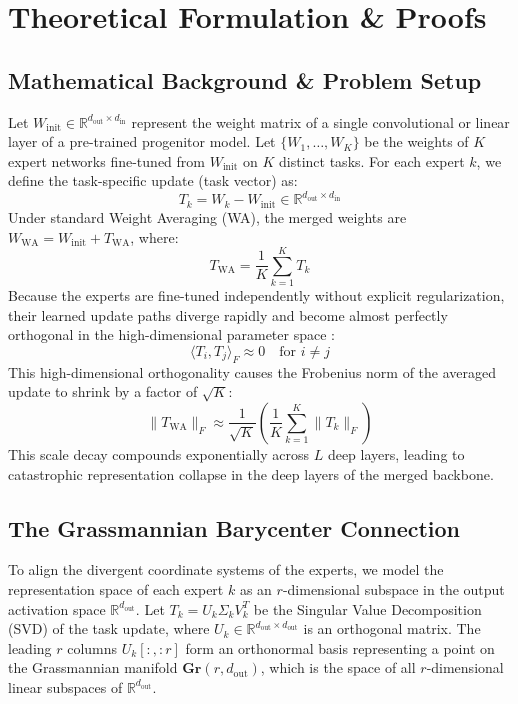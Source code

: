 \documentclass{article}
\theoremstyle{plain}
\theoremstyle{definition}
\theoremstyle{remark}
\begin{document}
\section{Theoretical Formulation \& Proofs}
\label{sec:theory}

\subsection{Mathematical Background \& Problem Setup}
Let $W_{\text{init}} \in \mathbb{R}^{d_{\text{out}} \times d_{\text{in}}}$ represent the weight matrix of a single convolutional or linear layer of a pre-trained progenitor model. Let $\{W_1, \ldots, W_K\}$ be the weights of $K$ expert networks fine-tuned from $W_{\text{init}}$ on $K$ distinct tasks. For each expert $k$, we define the task-specific update (task vector) as:
\begin{equation}
    T_k = W_k - W_{\text{init}} \in \mathbb{R}^{d_{\text{out}} \times d_{\text{in}}}
\end{equation}
Under standard Weight Averaging (WA), the merged weights are $W_{\text{WA}} = W_{\text{init}} + T_{\text{WA}}$, where:
\begin{equation}
    T_{\text{WA}} = \frac{1}{K} \sum_{k=1}^K T_k
\end{equation}
Because the experts are fine-tuned independently without explicit regularization, their learned update paths diverge rapidly and become almost perfectly orthogonal in the high-dimensional parameter space \citep{choshen2022fusing, anonymous2026holographic}:
\begin{equation}
    \langle T_i, T_j \rangle_F \approx 0 \quad \text{for } i \neq j
\end{equation}
This high-dimensional orthogonality causes the Frobenius norm of the averaged update to shrink by a factor of $\sqrt{K}$:
\begin{equation}
    \| T_{\text{WA}} \|_F \approx \frac{1}{\sqrt{K}} \left( \frac{1}{K} \sum_{k=1}^K \| T_k \|_F \right)
\end{equation}
This scale decay compounds exponentially across $L$ deep layers, leading to catastrophic representation collapse in the deep layers of the merged backbone.

\subsection{The Grassmannian Barycenter Connection}
To align the divergent coordinate systems of the experts, we model the representation space of each expert $k$ as an $r$-dimensional subspace in the output activation space $\mathbb{R}^{d_{\text{out}}}$. Let $T_k = U_k \Sigma_k V_k^T$ be the Singular Value Decomposition (SVD) of the task update, where $U_k \in \mathbb{R}^{d_{\text{out}} \times d_{\text{out}}}$ is an orthogonal matrix. The leading $r$ columns $U_k[:, :r]$ form an orthonormal basis representing a point on the Grassmannian manifold $\mathbf{Gr}(r, d_{\text{out}})$, which is the space of all $r$-dimensional linear subspaces of $\mathbb{R}^{d_{\text{out}}}$.
\end{document}
